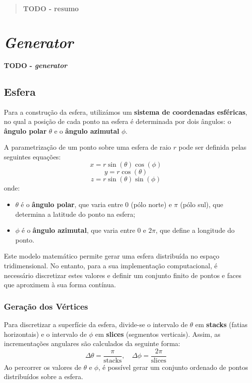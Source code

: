 \documentclass[12pt, a4paper]{article}
\begin{document}
\pagebreak

\begin{abstract}
    \textbf{\color{red} TODO - resumo}
\end{abstract}

\section{\emph{Generator}}

\textbf{\color{red} TODO - \emph{generator}}

\subsection{Esfera}

Para a construção da esfera, utilizámos um \textbf{sistema de coordenadas esféricas},
no qual a posição de cada ponto na esfera é determinada por dois ângulos: o
\textbf{ângulo polar} \( \theta \) e o \textbf{ângulo azimutal} \( \phi \).

A parametrização de um ponto sobre uma esfera de raio \( r \) pode ser definida pelas seguintes
equações:
\[
x = r \sin(\theta) \cos(\phi)
\]
\[
y = r \cos(\theta)
\]
\[
z = r \sin(\theta) \sin(\phi)
\]
onde:
\begin{itemize}
\item \( \theta \) é o \textbf{ângulo polar}, que varia entre \( 0 \) (pólo norte) e \( \pi \)
(pólo sul), que determina a latitude do ponto na esfera;
\item \( \phi \) é o \textbf{ângulo azimutal}, que varia entre \( 0 \) e \( 2\pi \), que define a
longitude do ponto.
\end{itemize}

Este modelo matemático permite gerar uma esfera distribuída no espaço tridimensional.
No entanto, para a sua implementação computacional, é necessário discretizar estes valores e
definir um conjunto finito de pontos e faces que aproximem à sua forma contínua.

\subsubsection{Geração dos Vértices}
Para discretizar a superfície da esfera, divide-se o intervalo de \( \theta \) em \textbf{stacks}
(fatias horizontais) e o intervalo de \( \phi \) em \textbf{slices} (segmentos verticais). Assim,
as incrementações angulares são calculados da seguinte forma:
\[
\Delta\theta = \frac{\pi}{\text{stacks}}, \quad \Delta\phi = \frac{2\pi}{\text{slices}}
\]
Ao percorrer os valores de \( \theta \) e \( \phi \), é possível gerar um conjunto ordenado
de pontos distribuídos sobre a esfera.
\end{document}
